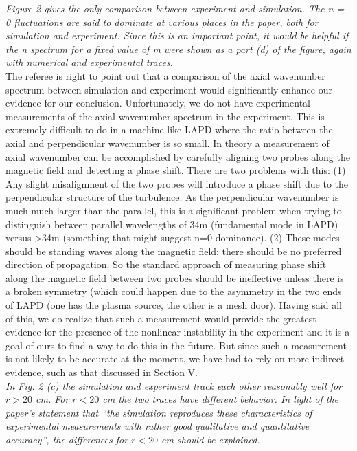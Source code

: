 \documentclass[12pt]{article}
\begin{document}
{\noindent \itshape   Figure 2 gives the only comparison between experiment and simulation. The n = 0
fluctuations are said to dominate at various places in the paper, both for simulation and
experiment. Since this is an important point, it would be helpful if the n spectrum for a
fixed value of m were shown as a part (d) of the figure, again with numerical and
experimental traces. }\\

{\noindent The referee is right to point out that a comparison of the axial wavenumber spectrum between simulation and experiment would significantly enhance our evidence for our conclusion.  Unfortunately, we do not have experimental measurements of the axial wavenumber spectrum in the experiment. This is extremely difficult to do in a machine like LAPD where the ratio between the axial and perpendicular wavenumber is so small.  In theory a measurement of axial wavenumber can be accomplished by carefully aligning two probes along the magnetic field and detecting a phase shift.  There are two problems with this: (1) Any slight misalignment of the two probes will introduce a phase shift due to the perpendicular structure of the turbulence.  As the perpendicular wavenumber is much much larger than the parallel, this is a significant problem when trying to distinguish between parallel wavelengths of 34m (fundamental mode in LAPD) versus >34m (something that might suggest n=0 dominance).  (2) These modes should be standing waves along the magnetic field:  there should be no preferred direction of propagation.  So the standard approach of measuring phase shift along the magnetic field between two probes should be ineffective unless there is a broken symmetry (which could happen due to the asymmetry in the two ends of LAPD (one has the plasma source, the other is a mesh door).  Having said all of this, we do realize that such a measurement would provide the greatest
evidence for the presence of the nonlinear instability in the experiment and it is a goal of ours to find a way to do this in the future. 
But since such a measurement is not likely to be accurate at the moment, we have had to rely on more indirect evidence, such as that discussed in Section V. }\\
   

{\noindent \itshape In Fig. 2 (c) the simulation and experiment track each other reasonably well for $r > 20$
cm. For $r < 20$ cm the two traces have different behavior. In light of the paper’s
statement that “the simulation reproduces these characteristics of experimental
measurements with rather good qualitative and quantitative accuracy”, the differences for
$r < 20$ cm should be explained. }\\
\end{document}
